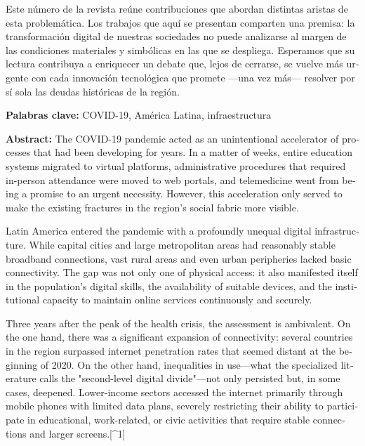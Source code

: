 \documentclass{article}
\begin{document}
\begin{tcolorbox}[colback=brown!8!white,colframe=brown!8!white,boxrule=0pt,arc=2pt,left=4pt,right=4pt,top=3pt,bottom=3pt,before skip=4pt,after skip=4pt]
\begin{otherlanguage}{spanish}
Este número de la revista reúne contribuciones que abordan distintas aristas de esta problemática. Los trabajos que aquí se presentan comparten una premisa: la transformación digital de nuestras sociedades no puede analizarse al margen de las condiciones materiales y simbólicas en las que se despliega. Esperamos que su lectura contribuya a enriquecer un debate que, lejos de cerrarse, se vuelve más urgente con cada innovación tecnológica que promete ---una vez más--- resolver por sí sola las deudas históricas de la región.
\par\smallskip\noindent\textbf{Palabras clave:} COVID-19, América Latina, infraestructura
\end{otherlanguage}
\end{tcolorbox}

\begin{tcolorbox}[colback=brown!8!white,colframe=brown!8!white,boxrule=0pt,arc=2pt,left=4pt,right=4pt,top=3pt,bottom=3pt,before skip=4pt,after skip=4pt]
\begin{otherlanguage}{english}
\sffamily\small \textbf{Abstract:} The COVID-19 pandemic acted as an unintentional accelerator of processes that had been developing for years. In a matter of weeks, entire education systems migrated to virtual platforms, administrative procedures that required in-person attendance were moved to web portals, and telemedicine went from being a promise to an urgent necessity. However, this acceleration only served to make the existing fractures in the region's social fabric more visible.

Latin America entered the pandemic with a profoundly unequal digital infrastructure. While capital cities and large metropolitan areas had reasonably stable broadband connections, vast rural areas and even urban peripheries lacked basic connectivity. The gap was not only one of physical access: it also manifested itself in the population's digital skills, the availability of suitable devices, and the institutional capacity to maintain online services continuously and securely.

Three years after the peak of the health crisis, the assessment is ambivalent. On the one hand, there was a significant expansion of connectivity: several countries in the region surpassed internet penetration rates that seemed distant at the beginning of 2020. On the other hand, inequalities in use—what the specialized literature calls the "second-level digital divide"—not only persisted but, in some cases, deepened. Lower-income sectors accessed the internet primarily through mobile phones with limited data plans, severely restricting their ability to participate in educational, work-related, or civic activities that require stable connections and larger screens.[\textasciicircum{}1]


\end{otherlanguage}
\end{tcolorbox}
\end{document}

